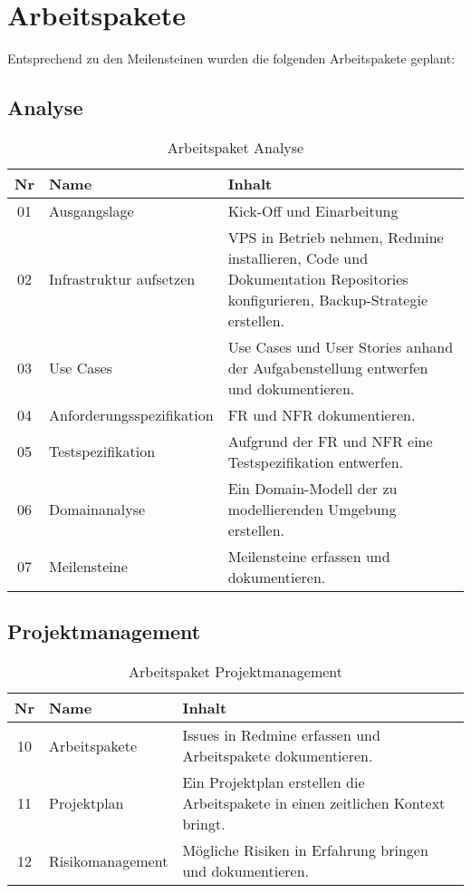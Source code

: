 \section{Arbeitspakete}
\label{sec:Arbeitspakete}

Entsprechend zu den Meilensteinen wurden die folgenden Arbeitspakete geplant:

\subsection{Analyse}
\begin{table}[H]
\begin{tabularx}{\textwidth}{ c | l | X }
\textbf{Nr} & \textbf{Name} & \textbf{Inhalt} \\ \hline
01 & Ausgangslage & Kick-Off und Einarbeitung \\ \hline
02 & Infrastruktur aufsetzen & VPS in Betrieb nehmen, Redmine installieren, Code und Dokumentation Repositories konfigurieren, Backup-Strategie erstellen. \\ \hline
03 & Use Cases & Use Cases und User Stories anhand der Aufgabenstellung entwerfen und dokumentieren.\\ \hline
04 & Anforderungsspezifikation & \ac{FR} und \ac{NFR} dokumentieren.\\ \hline
05 & Testspezifikation & Aufgrund der \ac{FR} und \ac{NFR} eine Testspezifikation entwerfen.\\ \hline
06 & Domainanalyse & Ein Domain-Modell der zu modellierenden Umgebung erstellen.\\ \hline
07 & Meilensteine & Meilensteine erfassen und dokumentieren.\\
\end{tabularx}
\caption{Arbeitspaket Analyse}
\end{table}

\subsection{Projektmanagement}
\begin{table}[H]
\begin{tabularx}{\textwidth}{ c | l | X }
\textbf{Nr} & \textbf{Name} & \textbf{Inhalt} \\ \hline
10 & Arbeitspakete & Issues in Redmine erfassen und Arbeitspakete dokumentieren. \\ \hline
11 & Projektplan & Ein Projektplan erstellen die Arbeitspakete in einen zeitlichen Kontext bringt.\\ \hline
12 & Risikomanagement & Mögliche Risiken in Erfahrung bringen und dokumentieren.\\ \hline
\end{tabularx}
\caption{Arbeitspaket Projektmanagement}
\end{table}

